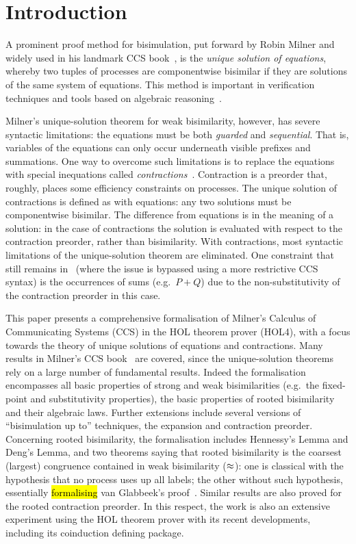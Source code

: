 \section{Introduction}

A prominent proof method for bisimulation, put forward by Robin Milner and widely used in his
landmark CCS book~\cite{Mil89}, is the
\emph{unique solution of equations}, whereby two tuples of processes are
componentwise bisimilar if they are solutions of the same system of equations.
This method is important in verification techniques and tools
based on algebraic reasoning~\cite{BaeBOOK,theoryAndPractice,RosUnder10}. 

Milner's unique-solution theorem for weak bisimilarity, however,
has severe syntactic limitations:
the equations must be both \emph{guarded} and \emph{sequential}. That is,
variables of the equations can only occur underneath visible prefixes and summations.
One way to overcome such limitations is to replace the equations
with special inequations called
\emph{contractions}~\cite{sangiorgi2015equations,sangiorgi2017equations}. Contraction is a
preorder that, roughly, places some efficiency constraints on processes.
The unique solution of contractions is defined as with equations:
any two solutions must be componentwise bisimilar.
The difference from equations is in the meaning of a solution:
in the case of contractions the solution is evaluated with respect to
the contraction preorder, rather than bisimilarity. 
With contractions, most syntactic limitations of the unique-solution theorem are
eliminated. One constraint that still remains
in~\cite{sangiorgi2017equations}
(where the issue is bypassed using a more
restrictive CCS syntax)
is the occurrences of sums (e.g.~$P + Q$) due to
the non-substitutivity of the contraction preorder in this case.

This paper presents a comprehensive formalisation of Milner's Calculus of Communicating
Systems (CCS) in the HOL theorem prover (HOL4),
with a focus towards the theory of unique solutions of equations and contractions.
Many results in Milner's CCS book~\cite{Mil89} are covered, since
the unique-solution theorems rely on a large number of fundamental results.
Indeed the formalisation encompasses all basic properties of strong and weak
bisimilarities (e.g.~the fixed-point and substitutivity properties), the
basic properties of rooted bisimilarity and their algebraic laws.
Further extensions include several versions of ``bisimulation up to''
techniques, the expansion and contraction preorder.
Concerning rooted bisimilarity, the formalisation
includes Hennessy's Lemma and Deng's Lemma,
 and two theorems saying that rooted bisimilarity is the coarsest (largest)
 congruence contained in weak bisimilarity ($\approx$): one is classical
 with the hypothesis that no process uses up all labels;
the other without such hypothesis, essentially \hl{formalising} van Glabbeek's proof~\cite{van2005characterisation}.
Similar results are also proved for the rooted contraction preorder.
In this respect, the work is also an extensive experiment using the HOL theorem prover with its
recent developments, including its coinduction defining package.

